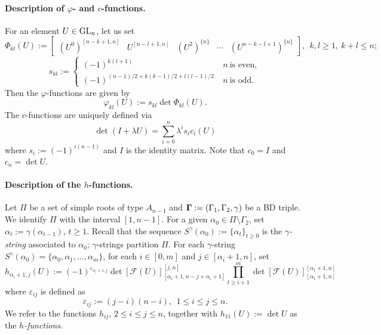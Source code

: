 \paragraph{Description of $\varphi$- and $c$-functions.} For an element $U \in \operatorname{GL}_n$, let us set
\begin{equation}\label{eq:big_phi_def_h}
\Phi_{kl}(U):=\begin{bmatrix}(U^0)^{[n-k+1,n]} & U^{[n-l+1,n]} & (U^2)^{\{n\}} & \cdots & (U^{n-k-l+1})^{\{n\}}\end{bmatrix}, \ \ k,l \geq 1, \ k+l \leq n;
\end{equation}
\begin{equation}\label{eq:s_def}
s_{kl}:=\begin{cases}
(-1)^{k(l+1)} \ &n \ \text{is even},\\
(-1)^{(n-1)/2 + k(k-1)/2 + l(l-1)/2} \ & n \ \text{is odd}.
\end{cases}
\end{equation}
Then the $\varphi$-functions are given by
\begin{equation}\label{eq:phi_h_def}
\varphi_{kl}(U):=s_{kl} \det \Phi_{kl}(U).
\end{equation}
The $c$-functions are uniquely defined via
\begin{equation}\label{eq:c_def}
\det(I+\lambda U) = \sum_{i=0}^{n} \lambda^{i} s_i c_i(U)
\end{equation}
where $s_i := (-1)^{i(n-1)}$ and $I$ is the identity matrix. Note that $c_0 = I$ and $c_n = \det U$. 

\paragraph{Description of the $h$-functions.} Let $\Pi$ be a set of simple roots of type $A_{n-1}$ and $\mathbf{\Gamma}:=(\Gamma_1,\Gamma_2,\gamma)$ be a BD triple. We identify $\Pi$  with the interval $[1,n-1]$. For a given $\alpha_0 \in \Pi \setminus \Gamma_2$, set $\alpha_t:=\gamma(\alpha_{t-1})$, $t \geq 1$. Recall that the sequence $S^{\gamma}(\alpha_0):=\{\alpha_{t}\}_{t \geq 0}$ is the \emph{$\gamma$-string} associated to $\alpha_0$; $\gamma$-strings partition $\Pi$. For each $\gamma$-string $S^{\gamma}(\alpha_0) = \{\alpha_0,\alpha_1,\ldots,\alpha_{m}\}$, for each $i \in [0,m]$ and $j \in [\alpha_i+1,n]$, set
\begin{equation}\label{eq:h_fun}
h_{\alpha_i+1,j}(U) := (-1)^{\varepsilon_{\alpha_i+1,j}}\det [\mathcal{F}(U)]^{[j,n]}_{[\alpha_i+1,n-j+\alpha_i+1]} \prod_{t \geq i+1}^m \det [\mathcal{F}(U)]^{[\alpha_t+1,n]}_{[\alpha_t+1,n]}
\end{equation}
where $\varepsilon_{ij}$ is defined as
\begin{equation}\label{eq:h_sign}
\varepsilon_{ij} := (j-i)(n-i), \ \ 1 \leq i \leq j \leq n.
\end{equation}
We refer to the functions $h_{ij}$, $2 \leq i \leq j \leq n$, together with $h_{11}(U):=\det U$ as the \emph{$h$-functions}. 

